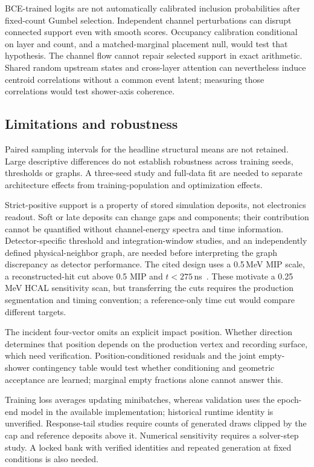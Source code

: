 \documentclass[11pt]{article}
\begin{document}
BCE-trained logits are not automatically calibrated inclusion probabilities after fixed-count Gumbel selection. Independent channel perturbations can disrupt connected support even with smooth scores. Occupancy calibration conditional on layer and count, and a matched-marginal placement null, would test that hypothesis. The channel flow cannot repair selected support in exact arithmetic. Shared random upstream states and cross-layer attention can nevertheless induce centroid correlations without a common event latent; measuring those correlations would test shower-axis coherence.

\subsection{Limitations and robustness}

Paired sampling intervals for the headline structural means are not retained. Large descriptive differences do not establish robustness across training seeds, thresholds or graphs. A three-seed study and full-data fit are needed to separate architecture effects from training-population and optimization effects.

Strict-positive support is a property of stored simulation deposits, not electronics readout. Soft or late deposits can change gaps and components; their contribution cannot be quantified without channel-energy spectra and time information. Detector-specific threshold and integration-window studies, and an independently defined physical-neighbor graph, are needed before interpreting the graph discrepancy as detector performance. The cited design uses a 0.5\,MeV MIP scale, a reconstructed-hit cut above 0.5 MIP and $t<275$\,ns~\cite{epiczdc}. These motivate a 0.25\,MeV HCAL sensitivity scan, but transferring the cuts requires the production segmentation and timing convention; a reference-only time cut would compare different targets.

The incident four-vector omits an explicit impact position. Whether direction determines that position depends on the production vertex and recording surface, which need verification. Position-conditioned residuals and the joint empty-shower contingency table would test whether conditioning and geometric acceptance are learned; marginal empty fractions alone cannot answer this.

Training loss averages updating minibatches, whereas validation uses the epoch-end model in the available implementation; historical runtime identity is unverified. Response-tail studies require counts of generated draws clipped by the cap and reference deposits above it. Numerical sensitivity requires a solver-step study. A locked bank with verified identities and repeated generation at fixed conditions is also needed.
\end{document}
